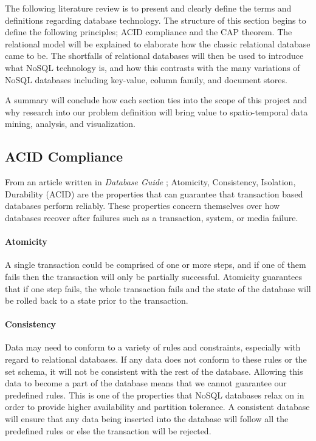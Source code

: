 The following literature review is to present and clearly define the terms and definitions regarding database technology. The structure of this section begins to define the following principles; ACID compliance and the CAP theorem. The relational model will be explained to elaborate how the classic relational database came to be. The shortfalls of relational databases will then be used to introduce what NoSQL technology is, and how this contrasts with the many variations of NoSQL databases including key-value, column family, and document stores. 

A summary will conclude how each section ties into the scope of this project and why research into our problem definition will bring value to spatio-temporal data mining, analysis, and visualization.

\subsection{ACID Compliance}
\label{sec:acid}

From an article written in \emph{Database Guide} \cite{acid}; Atomicity, Consistency, Isolation, Durability (ACID) are the properties that can guarantee that transaction based databases perform reliably. These properties concern themselves over how databases recover after failures such as a transaction, system, or media failure.

\paragraph{Atomicity}
A single transaction could be comprised of one or more steps, and if one of them fails then the transaction will only be partially successful. Atomicity guarantees that if one step fails, the whole transaction fails and the state of the database will be rolled back to a state prior to the transaction. 

\paragraph{Consistency}
Data may need to conform to a variety of rules and constraints, especially with regard to relational databases. If any data does not conform to these rules or the set schema, it will not be consistent with the rest of the database. Allowing this data to become a part of the database means that we cannot guarantee our predefined rules. This is one of the properties that NoSQL databases relax on in order to provide higher availability and partition tolerance. A consistent database will ensure that any data being inserted into the database will follow all the predefined rules or else the transaction will be rejected.

